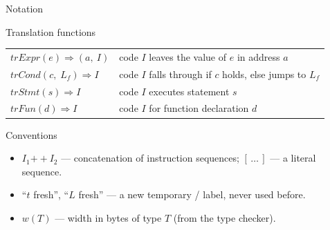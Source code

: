 \documentclass[aspectratio=169,11pt,xcolor=table]{beamer}
\newcommand{\trExpr}[1]{\mathit{trExpr}(#1)}
\newcommand{\trStmt}[1]{\mathit{trStmt}(#1)}
\newcommand{\trFun}[1]{\mathit{trFun}(#1)}
\newcommand{\trCond}[2]{\mathit{trCond}(#1,\;#2)}
\newcommand{\cat}{\mathbin{+\!\!+}}
\begin{document}
\begin{frame}{Notation}
  \small
  \begin{block}{Translation functions}
    \begin{tabular}{ll}
      $\trExpr{e} \Rightarrow (a,\ I)$     & code $I$ leaves the value of $e$ in address $a$ \\[0.2em]
      $\trCond{c}{L_f} \Rightarrow I$      & code $I$ falls through if $c$ holds, else jumps to $L_f$ \\[0.2em]
      $\trStmt{s} \Rightarrow I$           & code $I$ executes statement $s$ \\[0.2em]
      $\trFun{d} \Rightarrow I$            & code $I$ for function declaration $d$
    \end{tabular}
  \end{block}
  \vspace{0.3em}
  \begin{block}{Conventions}
    \begin{itemize}
      \item $I_1 \cat I_2$ — concatenation of instruction sequences; $[\,\ldots\,]$ — a literal sequence.
      \item ``$t$ fresh'', ``$L$ fresh'' — a new temporary / label, never used before.
      \item $w(T)$ — width in bytes of type $T$ (from the type checker).
    \end{itemize}
  \end{block}
\end{frame}
\end{document}
